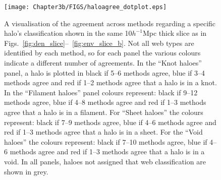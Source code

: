 \begin{figure}
 \texttt{[image: Chapter3b/FIGS/haloagree\_dotplot.eps]}
 \vspace{-.4cm}
 \caption{A visualisation of the agreement across methods regarding a specific halo's classification shown in the same 10$h^{-1}$Mpc thick slice as in Figs.~\ref{fig:den_slice}--~\ref{fig:env_slice_b}. Not all web types are identified by each method, so for each panel the various colours indicate a different number of agreements. In the ``Knot haloes'' panel, a halo is plotted in black if 5--6 methods agree, blue if 3--4 methods agree and red if 1--2 methods agree that a halo is in a knot. In the ``Filament haloes'' panel colours represent: black if 9--12 methods agree, blue if 4--8 methods agree and red if 1--3 methods agree that a halo is in a filament. For ``Sheet haloes'' the colours represent: black if 7--9 methods agree, blue if 4--6 methods agree and red if 1--3 methods agree that a halo is in a sheet. For the ``Void haloes'' the colours represent: black if 7--10 methods agree, blue if 4--6 methods agree and red if 1--3 methods agree that a halo is in a void. In all panels, haloes not assigned that web classification are shown in grey. }
  \label{fig:halo_agree_dot}
\end{figure}


